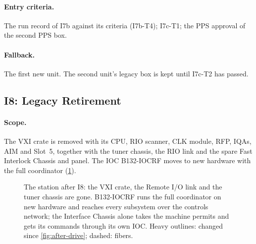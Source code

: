 \paragraph{Entry criteria.} The run record of I7b against its criteria (I7b-T4);
I7c-T1; the PPS approval of the second PPS box.

\paragraph{Fallback.} The first new unit. The second unit's legacy box is kept until
I7c-T2 has passed.

\subsection{I8: Legacy Retirement}\label{sec:i-retire}

\paragraph{Scope.} The VXI crate is removed with its CPU, RIO scanner, CLK module,
RFP, IQAs, AIM and Slot~5, together with the tuner chassis, the RIO link and the spare
Fast Interlock Chassis and panel. The IOC \mbox{B132-IOCRF} moves to new hardware with
the full coordinator (\cref{fig:after-retire}).

\begin{figure}[H]
\centering
\begin{fitpicture}

\end{fitpicture}
\caption[The station after I8.]{The station after I8: the VXI crate, the Remote I/O
link and the tuner chassis are gone. \mbox{B132-IOCRF} runs the full coordinator on new
hardware and reaches every subsystem over the controls network; the Interface Chassis
alone takes the machine permits and gets its commands through its own IOC. Heavy
outlines: changed since \cref{fig:after-drive}; dashed: fibers.}\label{fig:after-retire}
\end{figure}


